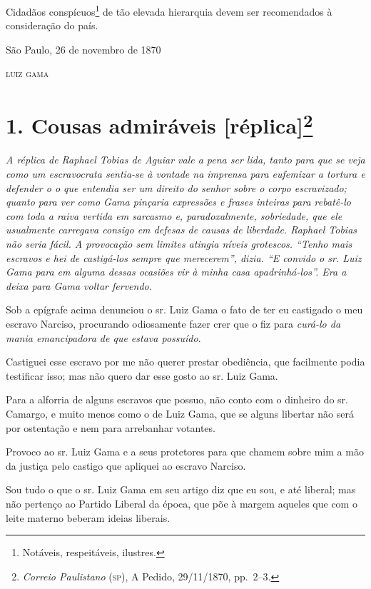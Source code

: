 Cidadãos conspícuos\footnote{ Notáveis, respeitáveis, ilustres.} de
tão elevada hierarquia devem ser recomendados à consideração do país.

\begin{flushright}
São Paulo, 26 de novembro de 1870

\textsc{luiz gama}
\end{flushright}

\chapter{1. Cousas admiráveis {[}réplica{]}\footnote{\emph{Correio Paulistano} (\textsc{sp}), A Pedido, 29/11/1870,
  pp.~2--3.}} %

\begin{didascalia}
\emph{A réplica de Raphael Tobias de Aguiar vale a pena ser lida, tanto
para que se veja como um escravocrata sentia-se à vontade na imprensa
para eufemizar a tortura e defender o o que entendia ser um direito do
senhor sobre o corpo escravizado; quanto para ver como Gama pinçaria
expressões e frases inteiras para rebatê-lo com toda a raiva vertida em
sarcasmo e, paradoxalmente, sobriedade, que ele usualmente carregava
consigo em defesas de causas de liberdade. Raphael Tobias não seria
fácil. A provocação sem limites atingia níveis grotescos. ``Tenho mais
escravos e hei de castigá-los sempre que merecerem'', dizia. ``E convido o
sr. Luiz Gama para em alguma dessas ocasiões vir à minha casa
apadrinhá-los''. Era a deixa para Gama voltar fervendo.}
\end{didascalia}


Sob a epígrafe acima denunciou o sr. Luiz Gama o fato de ter eu
castigado o meu escravo Narciso, procurando odiosamente fazer crer que o
fiz para \emph{curá-lo da mania emancipadora de que estava possuído}.

Castiguei esse escravo por me não querer prestar obediência, que
facilmente podia testificar isso; mas não quero dar esse gosto ao sr.
Luiz Gama.

Para a alforria de alguns escravos que possuo, não conto com o dinheiro
do sr. Camargo, e muito menos como o de Luiz Gama, que se alguns
libertar não será por ostentação e nem para arrebanhar votantes.

Provoco ao sr. Luiz Gama e a seus protetores para que chamem sobre mim a
mão da justiça pelo castigo que apliquei ao escravo Narciso.

Sou tudo o que o sr. Luiz Gama em seu artigo diz que eu sou, e até
liberal; mas não pertenço ao Partido Liberal da época, que põe à margem
aqueles que com o leite materno beberam ideias liberais.

